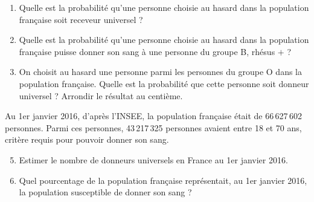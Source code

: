 \begin{exercice}[CRPE 2018 G2]
\begin{enumerate}
      \item Quelle est la probabilité qu’une personne choisie au hasard dans la population française soit receveur universel ?
      \item Quelle est la probabilité qu’une personne choisie au hasard dans la population française puisse donner son sang à une personne du groupe B, rhésus $+$ ?
      \item On choisit au hasard une personne parmi les personnes du groupe O dans la population française. Quelle est la probabilité que cette personne soit donneur universel ? Arrondir le résultat au centième. \\ [-3mm]
   \end{enumerate}
   Au 1er janvier 2016, d’après l’INSEE, la population française était de 66\,627\,602 personnes.
   Parmi ces personnes, 43\,217\,325 personnes avaient entre 18 et 70 ans, critère requis pour pouvoir donner son sang.
   \begin{enumerate}
   \setcounter{enumi}{4}
      \item Estimer le nombre de donneurs universels en France au 1er janvier 2016.
      \item Quel pourcentage de la population française représentait, au 1er janvier 2016, la population susceptible de donner son sang ?
   \end{enumerate}
\end{exercice}

